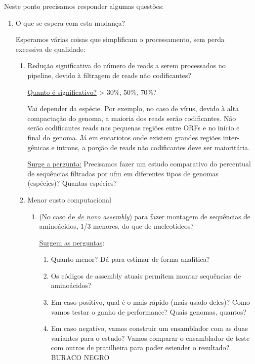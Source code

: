 \documentclass[12pt]{article}
\begin{document}
Neste ponto precisamos responder algumas questões:

\begin{enumerate}
    \item O que se espera com esta mudança?   
    
    Esperamos várias coisas que simplificam o processamento, sem perda excessiva de qualidade:
    
    \begin{enumerate}
        \item Redução significativa do número de reads a serem processados no pipeline, devido à filtragem de reads não codificantes? 
        
        \underline{Quanto é significativo?} > 30\%, 50\%, 70\%? 
        
        Vai depender da espécie. Por exemplo, no caso de vírus, devido à alta compactação do genoma, a maioria dos reads serão codificantes. Não serão codificantes reads nas pequenas regiões entre ORFs e no início e final do genoma. Já em eucariotos onde existem grandes regiões inter-gênicas e introns, a porção de reads não codificantes deve ser maioritária.
        
        \underline{Surge a pergunta:} Precisamos fazer um estudo comparativo do percentual de sequências filtradas por \gls{ufm} em diferentes tipos de genomas (espécies)? Quantas espécies? 
        
        \item Menor custo computacional 
        
        \begin{enumerate}
            \item (\underline{No caso de {\it{de novo assembly}}}) para fazer montagem de sequências de aminoácidos, 1/3 menores, do que de nucleotídeos?
            
             \underline{Surgem as perguntas}:
            \begin{enumerate}
                \item Quanto menor? Dá para estimar de forma analítica?
                \item Os códigos de assembly atuais permitem montar sequências de aminoácidos? 
                \item Em caso positivo, qual é o mais rápido (mais usado deles)? Como vamos testar o ganho de performance? Quais genomas, quantos?
                \item Em caso negativo, vamos construir um ensamblador com as duas variantes para o estudo? Vamos comparar o ensamblador de teste com outros de pratilheira para poder estender o resultado? BURACO NEGRO
            \end{enumerate} 
            

\end{enumerate}
\end{enumerate}
\end{enumerate}
\end{document}
